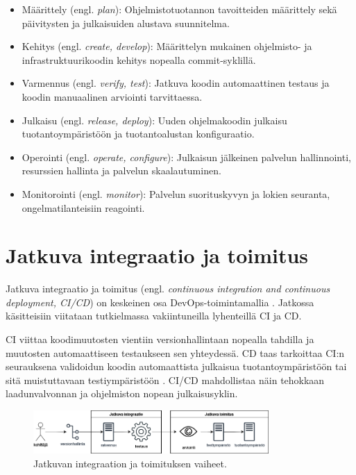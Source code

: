 \begin{itemize}
\item Määrittely (engl. \textit{plan}): Ohjelmistotuotannon tavoitteiden määrittely sekä päivitysten ja julkaisuiden alustava suunnitelma.
\item Kehitys (engl. \textit{create, develop}): Määrittelyn mukainen ohjelmisto- ja infrastruktuurikoodin kehitys nopealla commit-syklillä.
\item Varmennus (engl. \textit{verify, test}): Jatkuva koodin automaattinen testaus ja koodin manuaalinen arviointi tarvittaessa.
\item Julkaisu (engl. \textit{release, deploy}): Uuden ohjelmakoodin julkaisu tuotantoympäristöön ja tuotantoalustan konfiguraatio.
\item Operointi (engl. \textit{operate, configure}): Julkaisun jälkeinen palvelun hallinnointi, resurssien hallinta ja palvelun skaalautuminen.
\item Monitorointi (engl. \textit{monitor}): Palvelun suorituskyvyn ja lokien seuranta, ongelmatilanteisiin reagointi.
\end{itemize}

\section{Jatkuva integraatio ja toimitus}

Jatkuva integraatio ja toimitus (engl. \textit{continuous integration and continuous deployment, CI/CD}) on keskeinen osa DevOps-toimintamallia \cite{Jabbari16, Leite19}. Jatkossa käsitteisiin viitataan tutkielmassa vakiintuneilla lyhenteillä CI ja CD.

CI viittaa koodimuutosten vientiin versionhallintaan nopealla tahdilla ja muutosten automaattiseen testaukseen sen yhteydessä.
CD taas tarkoittaa CI:n seurauksena validoidun koodin automaattista julkaisua tuotantoympäristöön tai sitä muistuttavaan testiympäristöön \cite{Shahin17}.
CI/CD mahdollistaa näin tehokkaan laadunvalvonnan ja ohjelmiston nopean julkaisusyklin.

\begin{figure}[ht]
\begin{center}
\includegraphics[width=0.8\textwidth]{figures/cicd-pipeline.png}
\caption{Jatkuvan integraation ja toimituksen vaiheet.\label{fig:cicd}}
\end{center}
\end{figure}

